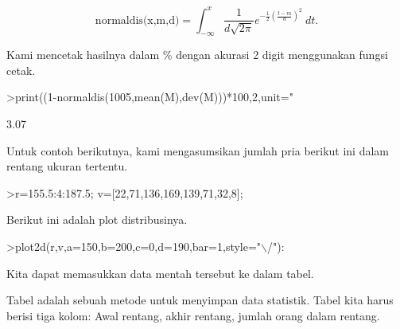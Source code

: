 \documentclass[12pt,arial,letterpaper]{book}
\begin{document}
\begin{eulernootebook}
\begin{eulercomment}
\begin{eulercomment}
\begin{eulernootebook}
\begin{eulercomment}
\begin{eulercomment}
\begin{eulercomment}
\begin{eulercomment}
\begin{eulercomment}
\begin{eulercomment}
\begin{eulercomment}
\begin{eulercomment}
\end{eulercomment}
\begin{eulerformula}
\[
\text{normaldis(x,m,d)}=\int_{-\infty}^x \frac{1}{d\sqrt{2\pi}}e^{-\frac{1}{2}(\frac{t-m}{d})^2}\ dt.
\]
\end{eulerformula}
\begin{eulercomment}
Kami mencetak hasilnya dalam \% dengan akurasi 2 digit menggunakan
fungsi cetak.
\end{eulercomment}
\begin{eulerprompt}
>print((1-normaldis(1005,mean(M),dev(M)))*100,2,unit=" %
\end{eulerprompt}
\begin{euleroutput}
        3.07 %
\end{euleroutput}
\begin{eulercomment}
Untuk contoh berikutnya, kami mengasumsikan jumlah pria berikut ini
dalam rentang ukuran tertentu.
\end{eulercomment}
\begin{eulerprompt}
>r=155.5:4:187.5; v=[22,71,136,169,139,71,32,8];
\end{eulerprompt}
\begin{eulercomment}
Berikut ini adalah plot distribusinya.
\end{eulercomment}
\begin{eulerprompt}
>plot2d(r,v,a=150,b=200,c=0,d=190,bar=1,style="\(\backslash\)/"):
\end{eulerprompt}
\begin{eulercomment}
Kita dapat memasukkan data mentah tersebut ke dalam tabel.

Tabel adalah sebuah metode untuk menyimpan data statistik. Tabel kita
harus berisi tiga kolom: Awal rentang, akhir rentang, jumlah orang
dalam rentang.


\end{eulercomment}
\end{eulercomment}
\end{eulercomment}
\end{eulercomment}
\end{eulercomment}
\end{eulercomment}
\end{eulercomment}
\end{eulercomment}
\end{eulernootebook}
\end{eulercomment}
\end{eulercomment}
\end{eulernootebook}
\end{document}
